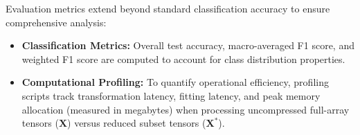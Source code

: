 \noindent
Evaluation metrics extend beyond standard classification accuracy to ensure comprehensive analysis:

\begin{itemize}
    \item \textbf{Classification Metrics:} Overall test accuracy, macro-averaged F1 score, and weighted F1 score are computed to account for class distribution properties.
    \item \textbf{Computational Profiling:} To quantify operational efficiency, profiling scripts track transformation latency, fitting latency, and peak memory allocation (measured in megabytes) when processing uncompressed full-array tensors ($\mathbf{X}$) versus reduced subset tensors ($\mathbf{X}^*$).
\end{itemize}